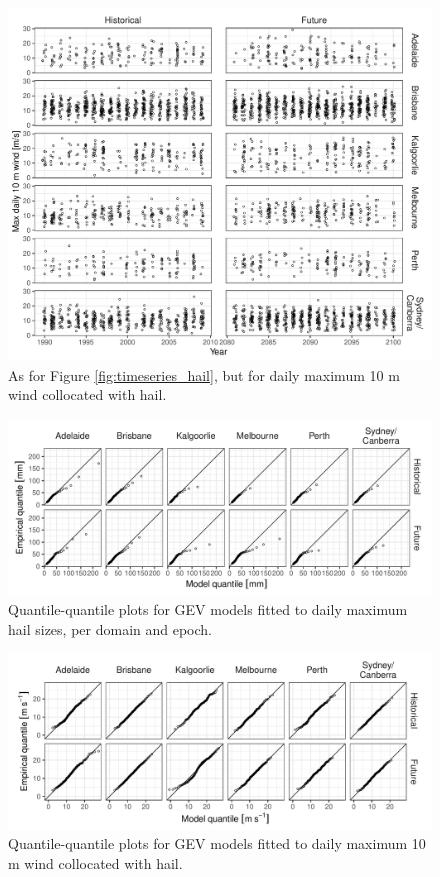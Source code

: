 \documentclass[draft,grl]{agutexSI2019}\usepackage[]{graphicx}\usepackage[]{xcolor}
\begin{document}
\begin{figure}[!ht]
    \includegraphics[width=\textwidth]{figures/timeseries_wind}
    \caption{As for Figure \ref{fig:timeseries_hail}, but for daily maximum 10 m wind collocated with hail.}
    \label{fig:timeseries_wind}
\end{figure}

\begin{figure}[!ht]
    \includegraphics[width=\textwidth]{figures/qq_hail}
    \caption{Quantile-quantile plots for GEV models fitted to daily maximum hail sizes, per domain and epoch.}
    \label{fig:qq_hail}
\end{figure}

\begin{figure}[!ht]
    \includegraphics[width=\textwidth]{figures/qq_wind}
    \caption{Quantile-quantile plots for GEV models fitted to daily maximum 10 m wind collocated with hail.}
    \label{fig:qq_wind}
\end{figure}
\end{document}
